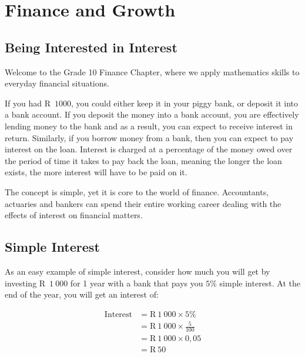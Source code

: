\chapter{Finance and Growth}

\section{ Being Interested in Interest}

Welcome to the Grade 10 Finance Chapter, where we apply mathematics skills to everyday financial situations.\par

If you had R~$1 000$, you could either keep it in your piggy bank, or deposit it into a bank account. If you deposit the
money into a bank account, you are effectively lending money to the bank and as a result, you can expect to receive
interest in return. Similarly, if you borrow money from a bank, then you can expect to pay interest on the loan.
Interest is charged at a percentage of the money owed over the period of time it takes to pay back the loan, meaning
the longer the loan exists, the more interest will have to be paid on it.\par

The concept is simple, yet it is core to the world of finance. Accountants, actuaries and bankers can spend their
entire working career dealing with the effects of interest on financial matters.\par

\section{Simple Interest}
  
As an easy example of simple interest, consider how much you will get by investing R~$1~000$ for 1 year with a bank that pays you $5\%$ simple interest. At the end of the year, you will get an interest of:\par
\begin{align*}
    \mathrm{Interest} &= \text{R}~1~000 \times 5\%\\
    &= \text{R}~1~000 \times \frac{5}{100}\\
    &= \text{R}~1~000 \times 0,05\\
    &= \text{R}~50
\end{align*}

